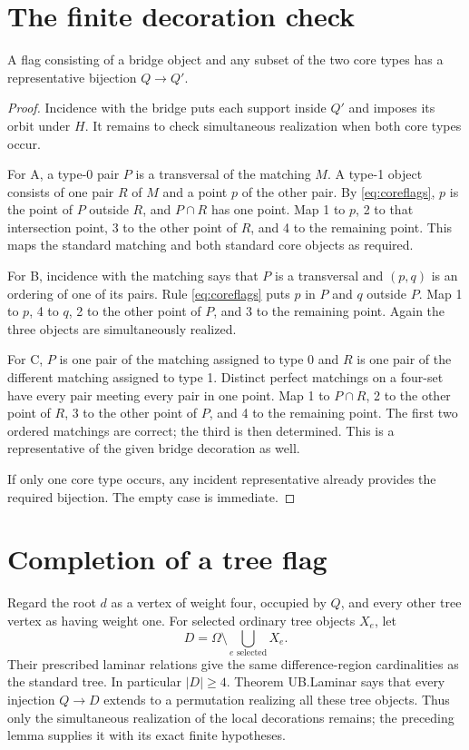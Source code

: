 \section{The finite decoration check}
\begin{lemma}\label{lem:decoration}
A flag consisting of a bridge object and any subset of the two core
types has a representative bijection $Q\longrightarrow Q'$.
\end{lemma}
\begin{proof}
Incidence with the bridge puts each support inside $Q'$ and imposes
its orbit under $H$. It remains to check simultaneous realization when
both core types occur.

For A, a type-0 pair $P$ is a transversal of the matching $M$.
A type-1 object consists of one pair $R$ of $M$ and a point $p$ of the
other pair. By \eqref{eq:coreflags}, $p$ is the point of $P$ outside $R$, and $P\cap R$
has one point. Map 1 to $p$, 2 to that intersection point, 3 to the
other point of $R$, and 4 to the remaining point. This maps the
standard matching and both standard core objects as required.

For B, incidence with the matching says that $P$ is a transversal and
$(p,q)$ is an ordering of one of its pairs. Rule \eqref{eq:coreflags} puts $p$ in $P$
and $q$ outside $P$. Map 1 to $p$, 4 to $q$, 2 to the other point
of $P$, and 3 to the remaining point. Again the three objects are
simultaneously realized.

For C, $P$ is one pair of the matching assigned to type 0 and $R$ is
one pair of the different matching assigned to type 1. Distinct
perfect matchings on a four-set have every pair meeting every pair
in one point. Map 1 to $P\cap R$, 2 to the other point of $R$,
3 to the other point of $P$, and 4 to the remaining point. The first
two ordered matchings are correct; the third is then determined.
This is a representative of the given bridge decoration as well.

If only one core type occurs, any incident representative already
provides the required bijection. The empty case is immediate.
\end{proof}

\section{Completion of a tree flag}\label{sec:regularity}
Regard the root $d$ as a vertex of weight four, occupied by $Q$,
and every other tree vertex as having weight one. For selected ordinary
tree objects $X_e$, let
\[
 D=\Omega\setminus\bigcup_{e\text{ selected}}X_e.
\]
Their prescribed laminar relations give the same difference-region
cardinalities as the standard tree. In particular $|D|\geq4$.
Theorem UB.Laminar says that every injection $Q\to D$ extends to a
permutation realizing all these tree objects. Thus only the simultaneous
realization of the local decorations remains; the preceding lemma
supplies it with its exact finite hypotheses.

